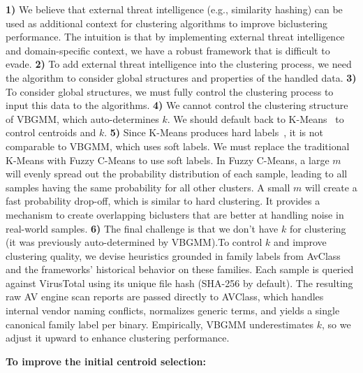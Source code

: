 \noindent \textbf{1)} We believe that external threat intelligence (e.g., similarity hashing) can be used as additional context for clustering algorithms to improve biclustering performance. The intuition is that by implementing external threat intelligence and domain-specific context, we have a robust framework that is difficult to evade.\newline
\noindent \textbf{2)} To add external threat intelligence into the clustering process, we need the algorithm to consider global structures and properties of the handled data. \newline
\noindent \textbf{3)} To consider global structures, we must fully control the clustering process to input this data to the algorithms.\newline 
\noindent \textbf{4)} We cannot control the clustering structure of VBGMM, which auto-determines $k$. We should default back to K-Means~\cite{lloyd1982_kmeans} to control centroids and $k$.\newline
\noindent \textbf{5)} Since K-Means produces hard labels~\cite{bezdek1984_fuzzycmeans}, it is not comparable to VBGMM, which uses soft labels. We must replace the traditional K-Means with Fuzzy C-Means to use soft labels. In Fuzzy C-Means, a large $m$ will evenly spread out the probability distribution of each sample, leading to all samples having the same probability for all other clusters. A small $m$ will create a fast probability drop-off, which is similar to hard clustering. It provides a mechanism to create overlapping biclusters that are better at handling noise in real-world samples.\newline
\noindent \textbf{6)} The final challenge is that we don't have $k$ for clustering (it was previously auto-determined by VBGMM).To control $k$ and improve clustering quality, we devise heuristics grounded in family labels from AvClass~\cite{DBLP:journals/corr/abs-2006-10615} and the frameworks’ historical behavior on these families. Each sample is queried against VirusTotal using its unique file hash (SHA-256 by default). The resulting raw AV engine scan reports are passed directly to AVClass, which handles internal vendor naming conflicts, normalizes generic terms, and yields a single canonical family label per binary. Empirically, VBGMM underestimates $k$, so we adjust it upward to enhance clustering performance.

\noindent\textbf{To improve the initial centroid selection:}

